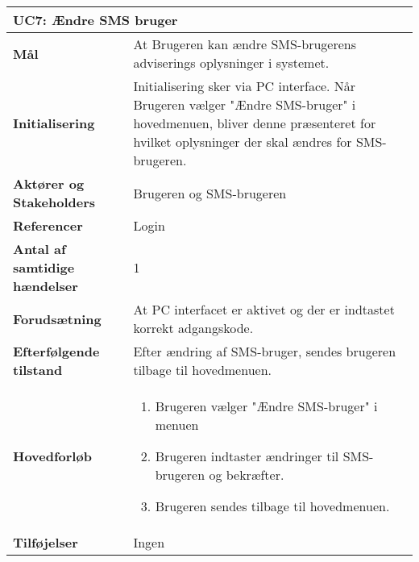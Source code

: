 \begin{table}[H] \centering
\begin{tabular}{|p{6cm}|p{8cm}|}
	\hline
\multicolumn{2}{|l|}{\textbf{UC7: Ændre SMS bruger}} \\\hline
\textbf{Mål}								&
At Brugeren kan ændre SMS-brugerens adviserings oplysninger i systemet.
 \\\hline
\textbf{Initialisering}					&
Initialisering sker via PC interface. Når Brugeren vælger "Ændre SMS-bruger" i hovedmenuen, bliver denne præsenteret for hvilket oplysninger der skal ændres for SMS-brugeren.
 \\\hline
\textbf{Aktører og Stakeholders}			&
Brugeren og SMS-brugeren
 \\\hline
\textbf{Referencer}						&
Login
 \\\hline
\textbf{Antal af samtidige hændelser}	&
1
 \\\hline
\textbf{Forudsætning}					&
At PC interfacet er aktivet og der er indtastet korrekt adgangskode.
 \\\hline
\textbf{Efterfølgende tilstand}			&
Efter ændring af SMS-bruger, sendes brugeren tilbage til hovedmenuen.
 \\\hline
\textbf{Hovedforløb}						&
\begin{enumerate}
\item Brugeren vælger "Ændre SMS-bruger" i menuen
\item Brugeren indtaster ændringer til SMS-brugeren og bekræfter.
\item Brugeren sendes tilbage til hovedmenuen.
\end{enumerate}
 \\\hline
\textbf{Tilføjelser}						&
Ingen \\\hline
	\end{tabular}
	\label{UC7} 
\end{table}